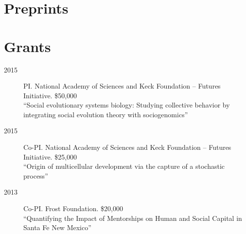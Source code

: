 \documentclass[11pt]{article}
\begin{document}
  \begin{publist}
    
    
    
  \end{publist}
  
  \section{Preprints}
  
  \begin{publist}

  \item {}
    
  \item {}
    
  \item {}
    
  \end{publist}
  


%     
    


  \section{Grants}
  \begin{description}
  \item[2015] PI. National Academy of Sciences and Keck Foundation -- Futures Initiative. \$50,000\\
    ``Social evolutionary systems biology: Studying collective behavior by integrating social evolution theory with sociogenomics''
  \item[2015] Co-PI. National Academy of Sciences and Keck Foundation -- Futures Initiative. \$25,000\\
    ``Origin of multicellular development via the capture of a stochastic process''
  \item[2013] Co-PI. Frost Foundation. \$20,000 \\
    ``Quantifying the Impact of Mentorships on Human and Social Capital in Santa Fe New Mexico''
  \end{description}
  
\end{document}
